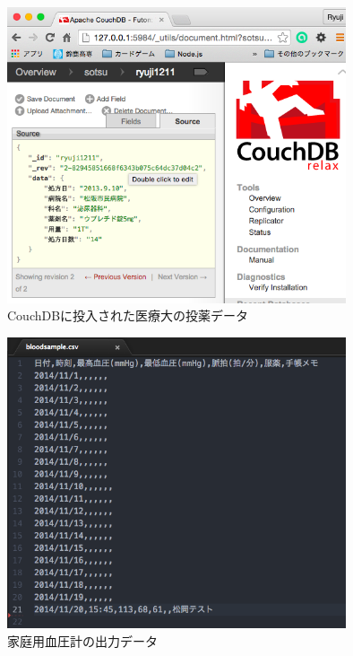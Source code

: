 			\begin{figure}[htbp]
				\begin{center}
					\includegraphics[width=10cm, bb=0 0 576 573]{./gazou/touyaku-data2.png}
				\end{center}
				\caption{CouchDBに投入された医療大の投薬データ}
				\label{iryoudai-touyaku-data}
			\end{figure}

			\begin{figure}[htbp]
				\begin{center}
					\includegraphics[width=10cm, bb=0 0 578 469]{./gazou/blood-data.png}
				\end{center}
				\caption{家庭用血圧計の出力データ}
				\label{blood-data}
			\end{figure}

